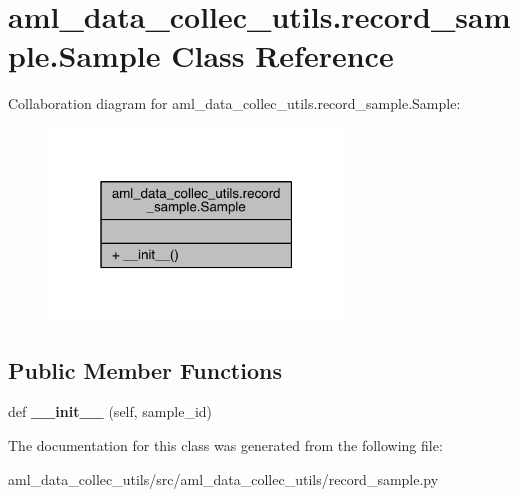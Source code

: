 \hypertarget{classaml__data__collec__utils_1_1record__sample_1_1_sample}{}\section{aml\+\_\+data\+\_\+collec\+\_\+utils.\+record\+\_\+sample.\+Sample Class Reference}
\label{classaml__data__collec__utils_1_1record__sample_1_1_sample}


Collaboration diagram for aml\+\_\+data\+\_\+collec\+\_\+utils.\+record\+\_\+sample.\+Sample\+:
\nopagebreak
\begin{figure}[H]
\begin{center}
\leavevmode
\includegraphics[width=223pt]{classaml__data__collec__utils_1_1record__sample_1_1_sample__coll__graph}
\end{center}
\end{figure}
\subsection*{Public Member Functions}
\begin{DoxyCompactItemize}
\item 
\hypertarget{classaml__data__collec__utils_1_1record__sample_1_1_sample_aa41df0b8fc71b08189581fc9b3690ec2}{}\label{classaml__data__collec__utils_1_1record__sample_1_1_sample_aa41df0b8fc71b08189581fc9b3690ec2} 
def {\bfseries \+\_\+\+\_\+init\+\_\+\+\_\+} (self, sample\+\_\+id)
\end{DoxyCompactItemize}


The documentation for this class was generated from the following file\+:\begin{DoxyCompactItemize}
\item 
aml\+\_\+data\+\_\+collec\+\_\+utils/src/aml\+\_\+data\+\_\+collec\+\_\+utils/record\+\_\+sample.\+py\end{DoxyCompactItemize}
